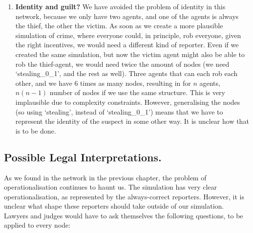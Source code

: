 \begin{enumerate}
\item \textbf{Identity and guilt?}
We have avoided the problem of identity in this network, because we only have two agents, and one of the agents is always the thief, the other the victim. As soon as we create a more plausible simulation of crime, where everyone could, in principle, rob everyone, given the right incentives, we would need a different kind of reporter. Even if we created the same simulation, but now the victim agent might also be able to rob the thief-agent, we would need twice the amount of nodes (we need `stealing\_0\_1', and the rest as well). Three agents that can each rob each other, and we have 6 times as many nodes, resulting in for $n$ agents, $n(n-1)$ number of nodes if we use the same structure. This is very implausible due to complexity constraints. However, generalising the nodes (so using `stealing', instead of `stealing\_0\_1') means that we have to represent the identity of the suspect in some other way. It is unclear how that is to be done.


\end{enumerate}


\subsection{Possible Legal Interpretations.}

As we found in the network in the previous chapter, the problem of operationalisation continues to haunt us. The simulation has very clear operationalisation, as represented by the always-correct reporters. However, it is unclear what shape these reporters should take outside of our simulation. Lawyers and judges would have to ask themselves the following questions, to be applied to every node:

